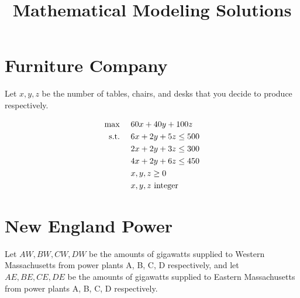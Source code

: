 \documentclass[12pt]{article}
\begin{document}
\title{Mathematical Modeling Solutions}

\maketitle

\section{Furniture Company}
Let $x, y, z$ be the number of tables, chairs, and desks that you decide to produce respectively.  

\begin{equation}
\label{eq:furniture_opt}
\begin{array}{rl}
\max~ & 60x + 40y + 100z \vspace{3pt}\\
\textup{s.t.}~ & 6x + 2y + 5z \leq 500 \vspace{3pt}\\
& 2x + 2y + 3z \leq 300 \vspace{3pt}\\
& 4x + 2y + 6z \leq 450 \vspace{3pt}\\
& x, y, z \geq 0 \vspace{3pt}\\
& x, y, z ~\textup{integer}\\
\end{array}
\end{equation}

\section{New England Power}
Let $AW, BW, CW, DW$ be the amounts of gigawatts supplied to Western Massachusetts from power plants A, B, C, D respectively, and let $AE, BE, CE, DE$ be the amounts of gigawatts supplied to Eastern Massachusetts from power plants A, B, C, D respectively.
\end{document}
